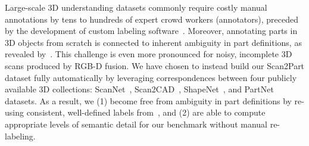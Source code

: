 Large-scale 3D understanding datasets commonly require costly manual annotations by tens to hundreds of expert crowd workers (annotators), preceded by the development of custom labeling software~\cite{armeni20163d,hua2016scenenn,dai2017scannet,chang2017matterport3d,2017arXiv170201105A,replica19arxiv,yi2016scalable,mo2019partnet}.
Moreover, annotating parts in 3D objects from scratch is connected to inherent ambiguity in part definitions, as revealed by~\cite{yi2016scalable,mo2019partnet}. This challenge is even more pronounced for noisy, incomplete 3D scans produced by RGB-D fusion.
We have chosen to instead build our Scan2Part dataset fully automatically by leveraging correspondences between four publicly available 3D collections: ScanNet~\cite{dai2017scannet}, Scan2CAD~\cite{avetisyan2019scan2cad}, ShapeNet~\cite{chang2015shapenet}, and PartNet~\cite{mo2019partnet} datasets.
As a result, we (1) become free from ambiguity in part definitions by re-using consistent, well-defined labels from~\cite{mo2019partnet}, and (2) are able to compute appropriate levels of semantic detail for our benchmark without manual re-labeling.


